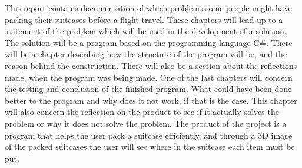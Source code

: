 This report contains documentation of which problems some people might have packing their suitcases before a flight travel. These chapters will lead up to a statement of the problem which will be used in the development of a solution.
\newline
The solution will be a program based on the programming language C#. There will be a chapter describing how the structure of the program will be, and the reason behind the construction. There will also be a section about the reflections made, when the program was being made.
\newline
One of the last chapters will concern the testing and conclusion of the finished program. What could have been done better to the program and why does it not work, if that is the case. This chapter will also concern the reflection on the product to see if it actually solves the problem or why it does not solve the problem.
\newline
The product of the project is a program that helps the user pack a suitcase efficiently, and through a 3D image of the packed suitcases the user will see where in the suitcase each item must be put.